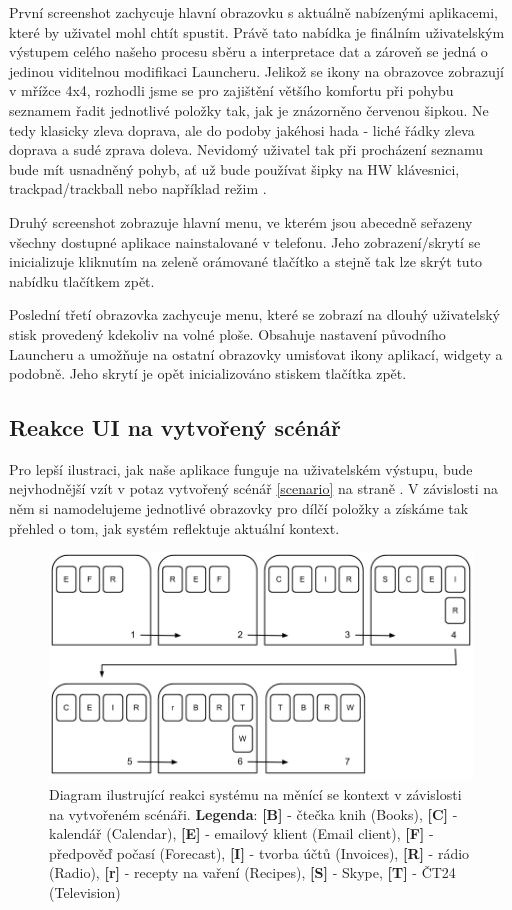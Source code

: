 \documentclass[thesis=M,czech]{FITthesis}[2012/06/26]
\begin{document}
První screenshot zachycuje hlavní obrazovku s aktuálně nabízenými aplikacemi, které by uživatel mohl chtít spustit. Právě tato nabídka je finálním uživatelským výstupem celého našeho procesu sběru a interpretace dat a zároveň se jedná o jedinou viditelnou modifikaci Launcheru. Jelikož se ikony na obrazovce zobrazují v mřížce 4x4, rozhodli jsme se pro zajištění většího komfortu při pohybu seznamem řadit jednotlivé položky tak, jak je znázorněno červenou šipkou. Ne tedy klasicky zleva doprava, ale do podoby jakéhosi hada - liché řádky zleva doprava a sudé zprava doleva. Nevidomý uživatel tak při procházení seznamu bude mít usnadněný pohyb, ať už bude používat šipky na HW klávesnici, trackpad/trackball nebo například režim \cite{explore_by_touch}.

Druhý screenshot zobrazuje hlavní menu, ve kterém jsou abecedně seřazeny všechny dostupné aplikace nainstalované v telefonu. Jeho zobrazení/skrytí se inicializuje kliknutím na zeleně orámované tlačítko a stejně tak lze skrýt tuto nabídku tlačítkem zpět.

Poslední třetí obrazovka zachycuje menu, které se zobrazí na dlouhý uživatelský stisk provedený kdekoliv na volné ploše. Obsahuje nastavení původního Launcheru a umožňuje na ostatní obrazovky umisťovat ikony aplikací, widgety a podobně. Jeho skrytí je opět inicializováno stiskem tlačítka zpět.

\subsection{Reakce UI na vytvořený scénář}
Pro lepší ilustraci, jak naše aplikace funguje na uživatelském výstupu, bude nejvhodnější vzít v potaz vytvořený scénář \ref{scenario} na straně \pageref{scenario}. V závislosti na něm si namodelujeme jednotlivé obrazovky pro dílčí položky a získáme tak přehled o tom, jak systém reflektuje aktuální kontext.

\begin{figure}\centering
	\includegraphics[width=1\textwidth]{figures/screens}
	\caption{Diagram ilustrující reakci systému na měnící se kontext v závislosti na vytvořeném scénáři. \textbf{Legenda}: \textbf{[B]} - čtečka knih (Books), \textbf{[C]} - kalendář (Calendar), \textbf{[E]} - emailový klient (Email client), \textbf{[F]} - předpověď počasí (Forecast), \textbf{[I]} - tvorba účtů (Invoices), \textbf{[R]} - rádio (Radio), \textbf{[r]} - recepty na vaření (Recipes), \textbf{[S]} - Skype, \textbf{[T]} - ČT24 (Television)}
	\label{fig:screens}
\end{figure}
\end{document}
